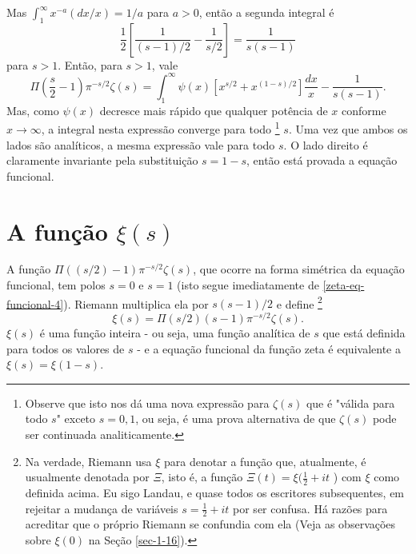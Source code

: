     Mas $\int_{1}^{\infty} x^{-a}(dx/x) = 1/a$ para $a > 0$, então a segunda integral é
    \begin{equation*}
        \frac{1}{2}\left[\frac{1}{(s-1)/2} - \frac{1}{s/2} \right] = \frac{1}{s(s-1)}
    \end{equation*}
    para $s>1$. Então, para $s>1$, vale
    \begin{equation}
        \label{zeta-eq-funcional-4}
        \Pi \left( \frac{s}{2} - 1 \right) \pi^{-s/2} \zeta(s) = \int_{1}^{\infty} \psi(x) [x^{s/2} + x^{(1 - s)/2}] \frac{dx}{x} - \frac{1}{s(s-1)}.
    \end{equation}
    Mas, como $\psi(x)$ decresce mais rápido que qualquer potência de $x$ conforme $x \to \infty$, a integral nesta expressão converge para todo
    \footnote{Observe que isto nos dá uma nova expressão para $\zeta(s)$ que é "válida para todo $s$" exceto $s = 0, 1$, ou seja, é uma prova alternativa de que $\zeta(s)$ pode ser continuada analiticamente.}
    $s$. Uma vez que ambos os lados são analíticos, a mesma expressão vale para todo $s$. O lado direito é claramente invariante pela substituição $s = 1-s$, então está provada a equação funcional.
    
    \section{A função $\xi(s)$}
    
    A função $\Pi((s/2) - 1) \pi^{-s/2} \zeta(s)$, que ocorre na forma simétrica da equação funcional, tem polos $s=0$ e $s=1$ (isto segue imediatamente de \eqref{zeta-eq-funcional-4}). Riemann multiplica ela por $s(s - 1)/2$ e define
    \footnote{Na verdade, Riemann usa $\xi$ para denotar a função que, atualmente, é usualmente denotada por $\Xi$, isto é, a função $\Xi(t) = \xi( \frac{1}{2} + it$ ) com $\xi$ como definida acima. Eu sigo Landau, e quase todos os escritores subsequentes, em rejeitar a mudança de variáveis $s = \frac{1}{2} + it$ por ser confusa. Há razões para acreditar que o próprio Riemann se confundia com ela (Veja as observações sobre $\xi(0)$ na Seção \ref{sec-1-16}).}
    \begin{equation}
        \label{xi(s)-1}
        \xi(s) = \Pi(s/2) (s - 1) \pi^{-s/2} \zeta(s).
    \end{equation}
    $\xi(s)$ é uma função inteira - ou seja, uma função analítica de $s$ que está definida para todos os valores de $s$ - e a equação funcional da função zeta é equivalente a $\xi(s) = \xi(1-s)$.
    

